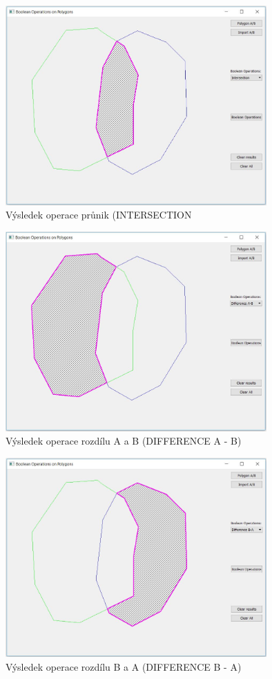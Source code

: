 \documentclass[a4paper, 12pt]{article}
\begin{document}
\begin{figure}[h!]
\centering
\includegraphics[width=10cm]{pictures/intersection.jpg}
\caption{Výsledek operace průnik (INTERSECTION}
\end{figure}

\begin{figure}[h!]
\centering
\includegraphics[width=10cm]{pictures/diffAB.jpg}
\caption{Výsledek operace rozdílu A a B (DIFFERENCE A - B)}
\end{figure}

\begin{figure}[h!]
\centering
\includegraphics[width=10cm]{pictures/diffBA.jpg}
\caption{Výsledek operace rozdílu B a A (DIFFERENCE B - A)}
\end{figure}
\end{document}
